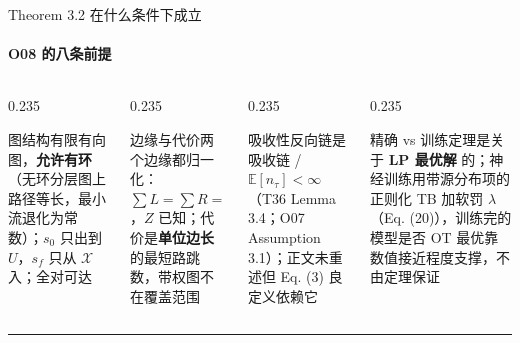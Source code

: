 \documentclass[aspectratio=169,10pt]{beamer}
\begin{document}
\begin{frame}{Theorem 3.2 在什么条件下成立}\framesubtitle{O08 的八条前提}
\begin{columns}[T]
\begin{column}{0.235\textwidth}\begin{block}{图结构}\footnotesize 有限有向图，\textbf{允许有环}（无环分层图上路径等长，最小流退化为常数）；$s_0$ 只出到 $U$，$s_f$ 只从 $\mathcal X$ 入；全对可达\end{block}\end{column}
\begin{column}{0.235\textwidth}\begin{block}{边缘与代价}\footnotesize 两个边缘都归一化：$\sum L=\sum R=1$，$Z$ 已知；代价是\textbf{单位边长}的最短路跳数，带权图不在覆盖范围\end{block}\end{column}
\begin{column}{0.235\textwidth}\begin{block}{吸收性}\footnotesize 反向链是吸收链 / $\mathbb E[n_\tau]<\infty$（T36 Lemma 3.4；O07 Assumption 3.1）；正文未重述但 Eq. (3) 良定义依赖它\end{block}\end{column}
\begin{column}{0.235\textwidth}\begin{block}{精确 vs 训练}\footnotesize 定理是关于 \textbf{LP 最优解} 的；神经训练用带源分布项的正则化 TB 加软罚 $\lambda$（Eq. (20)），训练完的模型是否 OT 最优靠数值接近程度支撑，不由定理保证\end{block}\end{column}
\end{columns}
\vfill\hrule\vspace{2pt}{\footnotesize\textcolor{neutral}{适用范围一句话：状态空间无法枚举、代价矩阵无法构造、但局部合法动作明确且允许回退的组合图上的均衡 OT。不适合显式小图（network simplex 更快更准且自带证书）。}}
\end{frame}
\end{document}
